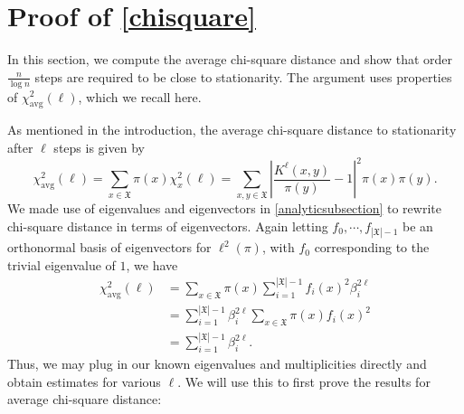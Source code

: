 \documentclass[11pt]{article}
\newcommand{\mf}{\mathfrak}
\newcounter{r}
\newcounter{s}
\numberwithin{equation}{section}
\begin{document}
\section{Proof of \cref{chisquare}}\label{chisquareboundsection}

In this section, we compute the average chi-square distance and show that order $\frac{n}{\log n}$ steps are required to be close to stationarity. The argument uses properties of $\chi_{\text{avg}}^2(\ell)$, which we recall here.

As mentioned in the introduction, the average chi-square distance to stationarity after $\ell$ steps is given by
\[
    \chi_{\text{avg}}^2(\ell) = \sum_{x \in \mf{X}} \pi(x) \chi_x^2(\ell) =  \sum_{x, y \in \mf{X}} \left|\frac{K^\ell(x, y)}{\pi(y)} - 1\right|^2 \pi(x) \pi(y).
\]
We made use of eigenvalues and eigenvectors in \cref{analyticsubsection} to rewrite chi-square distance in terms of eigenvectors. Again letting $f_0, \cdots, f_{|\mf{X}| - 1}$ be an orthonormal basis of eigenvectors for $\ell^2(\pi)$, with $f_0$ corresponding to the trivial eigenvalue of $1$, we have
\begin{align}\label{chisquarebound}
    \chi_{\text{avg}}^2(\ell) &= \sum_{x \in \mf{X}} \pi(x) \sum_{i = 1}^{|\mf{X}| - 1} f_i(x)^2 \beta_i^{2\ell} \nonumber \\
    &= \sum_{i = 1}^{|\mf{X}| - 1} \beta_i^{2\ell} \sum_{x \in \mf{X}} \pi(x) f_i(x)^2 \nonumber  \\
    &= \sum_{i = 1}^{|\mf{X}| - 1} \beta_i^{2\ell}.
\end{align}
Thus, we may plug in our known eigenvalues and multiplicities directly and obtain estimates for various $\ell$. We will use this to first prove the results for average chi-square distance:
\end{document}
